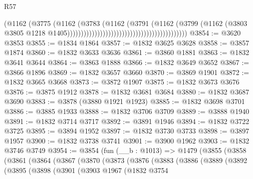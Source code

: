 \begin{lexlean}{R57}
\begin{coremodule}
                                                                        (@1162
                                                                          (@3775
                                                                            (@1162
                                                                              (@3783
                                                                                (@1162
                                                                                  (@3791
                                                                                    (@1162
                                                                                      (@3799
                                                                                        (@1162
                                                                                          (@3803
                                                                                            @3805
                                                                                            @1218
                                                                                            @1405))))))))))))))))))))))))))))))))))))))))))))
@3854 := @3620 @3853
@3855 := @1834 @1864
@3857 := @1832 @3625 @3628
@3858 := @3857 @1874
@3860 := @1832 @3633 @3636
@3861 := @3860 @1881
@3863 := @1832 @3641 @3644
@3864 := @3863 @1888
@3866 := @1832 @3649 @3652
@3867 := @3866 @1896
@3869 := @1832 @3657 @3660
@3870 := @3869 @1901
@3872 := @1832 @3665 @3668
@3873 := @3872 @1907
@3875 := @1832 @3673 @3676
@3876 := @3875 @1912
@3878 := @1832 @3681 @3684
@3880 := @1832 @3687 @3690
@3883 := @3878 (@3880 @1921 @1923)
@3885 := @1832 @3698 @3701
@3886 := @3885 @1933
@3888 := @1832 @3706 @3709
@3889 := @3888 @1940
@3891 := @1832 @3714 @3717
@3892 := @3891 @1946
@3894 := @1832 @3722 @3725
@3895 := @3894 @1952
@3897 := @1832 @3730 @3733
@3898 := @3897 @1957
@3900 := @1832 @3738 @3741
@3901 := @3900 @1962
@3903 := @1832 @3746 @3749
@3954 := @3854
    (fun (__b : @1013) =>
    @1479
      (@3855
        (@3858
          (@3861
            (@3864
              (@3867
                (@3870
                  (@3873
                    (@3876
                      (@3883
                        (@3886
                          (@3889
                            (@3892
                              (@3895
                                (@3898
                                  (@3901
                                    (@3903
                                      @1967
                                      (@1832
                                        @3754

\end{coremodule}
\end{lexlean}
